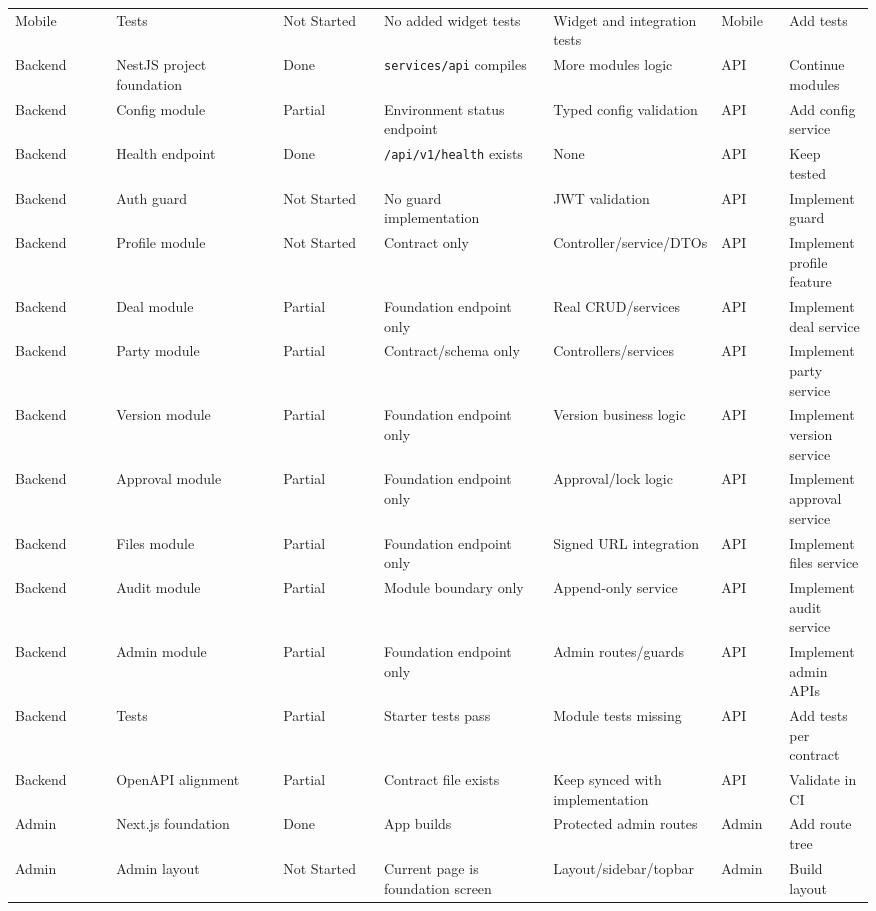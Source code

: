 \begin{longtable}{p{0.12\linewidth}p{0.2\linewidth}p{0.12\linewidth}p{0.2\linewidth}p{0.18\linewidth}p{0.08\linewidth}p{0.14\linewidth}}
Mobile & Tests & Not Started & No added widget tests & Widget and integration tests & Mobile & Add tests \\
Backend & NestJS project foundation & Done & \texttt{services/api} compiles & More modules logic & API & Continue modules \\
Backend & Config module & Partial & Environment status endpoint & Typed config validation & API & Add config service \\
Backend & Health endpoint & Done & \texttt{/api/v1/health} exists & None & API & Keep tested \\
Backend & Auth guard & Not Started & No guard implementation & JWT validation & API & Implement guard \\
Backend & Profile module & Not Started & Contract only & Controller/service/DTOs & API & Implement profile feature \\
Backend & Deal module & Partial & Foundation endpoint only & Real CRUD/services & API & Implement deal service \\
Backend & Party module & Partial & Contract/schema only & Controllers/services & API & Implement party service \\
Backend & Version module & Partial & Foundation endpoint only & Version business logic & API & Implement version service \\
Backend & Approval module & Partial & Foundation endpoint only & Approval/lock logic & API & Implement approval service \\
Backend & Files module & Partial & Foundation endpoint only & Signed URL integration & API & Implement files service \\
Backend & Audit module & Partial & Module boundary only & Append-only service & API & Implement audit service \\
Backend & Admin module & Partial & Foundation endpoint only & Admin routes/guards & API & Implement admin APIs \\
Backend & Tests & Partial & Starter tests pass & Module tests missing & API & Add tests per contract \\
Backend & OpenAPI alignment & Partial & Contract file exists & Keep synced with implementation & API & Validate in CI \\
Admin & Next.js foundation & Done & App builds & Protected admin routes & Admin & Add route tree \\
Admin & Admin layout & Not Started & Current page is foundation screen & Layout/sidebar/topbar & Admin & Build layout \\

\end{longtable}
